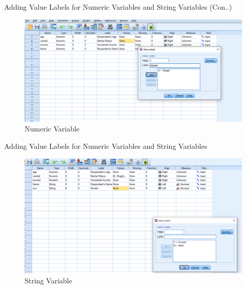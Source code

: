 \begin{frame}[t]{Adding Value Labels for Numeric Variables and String Variables (Con..)}
	\begin{figure}
		\centering
		\includegraphics[width=12cm]{img/value_num}
		\caption{Numeric Variable}
	\end{figure}
\end{frame}
\begin{frame}[t]{Adding Value Labels for Numeric Variables and String Variables}
	\begin{figure}
		\centering
		\includegraphics[width=12cm]{img/value_str}
		\caption{String Variable}
	\end{figure}
\end{frame}


